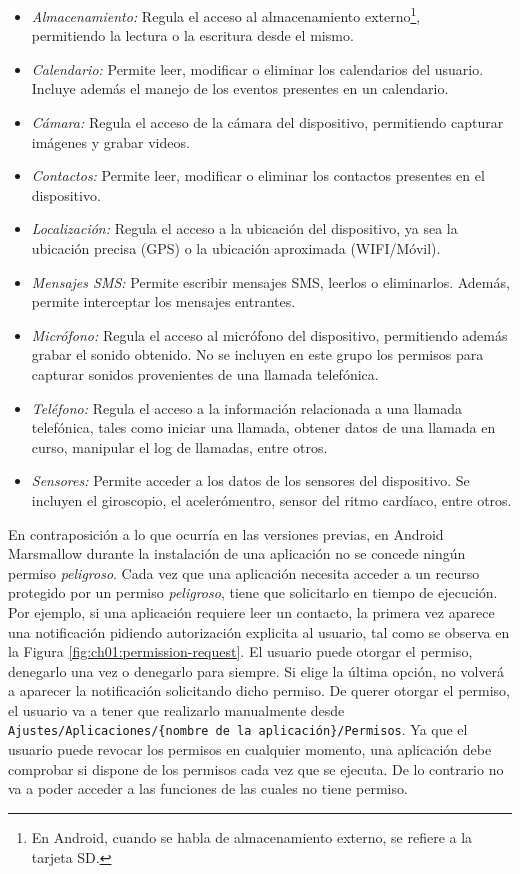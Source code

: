 \begin{itemize}
    \item \emph{Almacenamiento:} Regula el acceso al almacenamiento externo\footnote{En Android, cuando se habla de almacenamiento externo, se refiere a la tarjeta SD.}, \\permitiendo la lectura o la escritura desde el mismo.
    \item \emph{Calendario:} Permite leer, modificar o eliminar los calendarios del usuario. Incluye además el manejo de los eventos presentes en un calendario.
    \item \emph{Cámara:} Regula el acceso de la cámara del dispositivo, permitiendo capturar imágenes y grabar videos.
    \item \emph{Contactos:} Permite leer, modificar o eliminar los contactos presentes en el dispositivo.
    \item \emph{Localización:} Regula el acceso a la ubicación del dispositivo, ya sea la ubicación precisa (GPS) o la ubicación aproximada (WIFI/Móvil).
    \item \emph{Mensajes SMS:} Permite escribir mensajes SMS, leerlos o eliminarlos. Además, permite interceptar los mensajes entrantes.
    \item \emph{Micrófono:} Regula el acceso al micrófono del dispositivo, permitiendo además grabar el sonido obtenido. No se incluyen en este grupo los permisos para capturar sonidos provenientes de una llamada telefónica.
    \item \emph{Teléfono:} Regula el acceso a la información relacionada a una llamada telefónica, tales como iniciar una llamada, obtener datos de una llamada en curso, manipular el log de llamadas, entre otros.
    \item \emph{Sensores:} Permite acceder a los datos de los sensores del dispositivo. Se incluyen el giroscopio, el acelerómentro, sensor del ritmo cardíaco, entre otros.
\end{itemize}
En contraposición a lo que ocurría en las versiones previas, en Android Marsmallow durante la instalación de una aplicación no se concede ningún permiso \textit{peligroso}. Cada vez que una aplicación necesita acceder a un recurso protegido por un permiso \textit{peligroso}, tiene que solicitarlo en tiempo de ejecución. Por ejemplo, si una aplicación requiere leer un contacto, la primera vez aparece una notificación pidiendo autorización explicita al usuario, tal como se observa en la Figura \ref{fig:ch01:permission-request}. El usuario puede otorgar el permiso, denegarlo una vez o denegarlo para siempre. Si elige la última opción, no volverá a aparecer la notificación solicitando dicho permiso. De querer otorgar el permiso, el usuario va a tener que realizarlo manualmente desde \texttt{Ajustes/Aplicaciones/\{nombre de la aplicación\}/Permisos}. Ya que el usuario puede revocar los permisos en cualquier momento, una aplicación debe comprobar si dispone de los permisos cada vez que se ejecuta. De lo contrario no va a poder acceder a las funciones de las cuales no tiene permiso.
